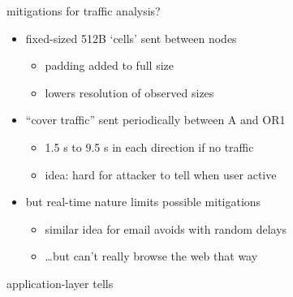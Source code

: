 \begin{frame}{mitigations for traffic analysis?}
    \begin{itemize}
    \item fixed-sized 512B `cells' sent between nodes
        \begin{itemize}
        \item padding added to full size
        \item lowers resolution of observed sizes
        \end{itemize}
    \item ``cover traffic'' sent periodically between A and OR1
        \begin{itemize}
        \item 1.5 s to 9.5 s in each direction if no traffic
        \item idea: hard for attacker to tell when user active
        \end{itemize}
    \item but real-time nature limits possible mitigations
        \begin{itemize}
        \item similar idea for email avoids with random delays
        \item \ldots but can't really browse the web that way
        \end{itemize}
    \end{itemize}
\end{frame}

\begin{frame}{application-layer tells}
\end{frame}
